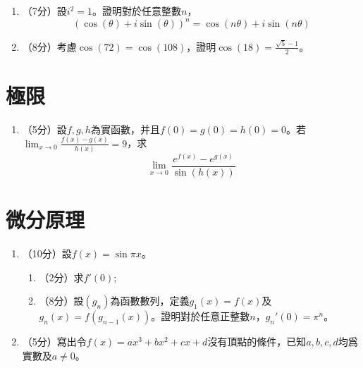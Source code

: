 \documentclass[12pt]{article}
\begin{document}
    \begin{enumerate}
        \item （7分）設$i^2=1$。證明對於任意整數$n$，$$(\cos(\theta)+i\sin(\theta))^n=\cos(n\theta)+i\sin(n\theta)$$
        \item （8分）考慮$\cos(72)=\cos(108)$，證明$\cos(18)=\frac{\sqrt{5}-1}{2}$。
    \end{enumerate}

    \section*{極限}

    \begin{enumerate}
        \item （5分）設$f,g,h$為實函數，并且$f(0)=g(0)=h(0)=0$。若$\lim_{x\to 0}\frac{f(x)-g(x)}{h(x)}=9$，求$$\lim_{x\to 0}\frac{e^{f(x)}-e^{g(x)}}{\sin(h(x))}$$
    \end{enumerate}

    \section*{微分原理}

    \begin{enumerate}
        \item （10分）設$f(x)=\sin{\pi x}$。\begin{enumerate}
            \item （2分）求$f'(0)$;
            \item （8分）設$(g_n)$為函數數列，定義$g_1(x)=f(x)$及$g_n(x)=f(g_{n-1}(x))$。證明對於任意正整數$n$，$g_n'(0)=\pi^n$。
        \end{enumerate}
        \item （5分）寫出令$f(x)=ax^3+bx^2+cx+d$沒有頂點的條件，已知$a,b,c,d$均爲實數及$a\neq 0$。
    \end{enumerate}
\end{document}
